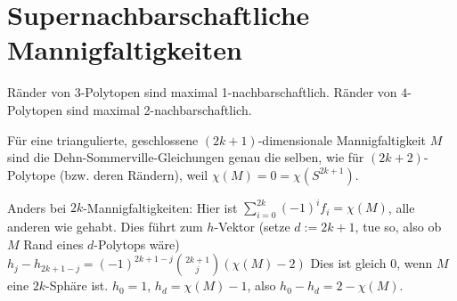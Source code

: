 \chapter{Supernachbarschaftliche Mannigfaltigkeiten}



Ränder von $3$-Polytopen sind maximal 1-nachbarschaftlich.
Ränder von $4$-Polytopen sind maximal 2-nachbarschaftlich.

Für eine triangulierte, geschlossene $(2k+1)$-dimensionale Mannigfaltigkeit $M$ sind die Dehn-Sommerville-Gleichungen genau die selben, wie für $(2k+2)$-Polytope (bzw. deren Rändern), weil $\chi(M) = 0 = \chi(S^{2k+1})$.

Anders bei $2k$-Mannigfaltigkeiten:
Hier ist $\sum_{i=0}^{2k} (-1)^i f_i = \chi(M)$, alle anderen wie gehabt.
Dies führt zum $h$-Vektor (setze $d := 2k + 1$, tue so, also ob $M$ Rand eines $d$-Polytops wäre)
\begin{math}
    h_j - h_{2k+1-j} = (-1)^{2k+1-j} \binom{2k+1}{j} (\chi(M) - 2)
\end{math}
Dies ist gleich $0$, wenn $M$ eine $2k$-Sphäre ist.
$h_0 = 1$, $h_d = \chi(M) - 1$, also $h_0 - h_d = 2 - \chi(M)$.

